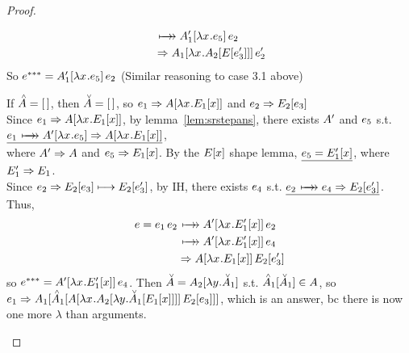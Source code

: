 \documentclass{article}
\begin{document}
\begin{proof}
\begin{byCases}
\begin{byCases}
\begin{align*}
                        &\srsteps \ap{\inA[_1']{\lx\e_5}}{\e_2} \\
                        &\pstep \ap{\inA[_1]{\lx\inA[_2]{\inE{\e_3'}}}}{\e_2'}
    \end{align*}
    So $\ethree = \ap{\inA[_1']{\lx\e_5}}{\e_2}$
    (Similar reasoning to case 3.1 above)
    \begin{byCases}
      \renewcommand{\byCasesCaseTemplate}[1]{\textbf{Subsubcase {#1}.}}
      \case{\Ap = \hole}
    If $\Ap = \hole$, then $\Am = \hole$, so
    $\e_1 \pstep \inA{\lx\inE[_1]{x}}$ and $\e_2 \pstep \inE[_2]{\e_3}$\\
    Since $\e_1 \pstep \inA{\lx\inE[_1]{x}}$, by lemma~\ref{lem:srstepans}, 
    there exists $\A'$ and $\e_5$ s.t. 
    $\underline{\e_1 \srsteps \inA[']{\lx\e_5} \pstep \inA{\lx\inE[_1]{x}}}$,\\
    where $\A' \pstep \A$ and $\e_5 \pstep \Ex[_1]$. By the $\Ex$ shape lemma, 
    $\underline{\e_5 = \Ex[_1']}$, where $\E_1' \pstep \E_1$.\\
    Since $\e_2 \pstep \inE[_2]{\e_3} \srstep \inE[_2]{\e_3'}$, by IH,
    there exists $\e_4$ s.t. $\underline{\e_2 \srsteps \e_4
                                             \pstep \inE[_2]{\e_3'}}$. Thus,
    \begin{align*}
      \e = \ap{\e_1}{\e_2} &\srsteps \ap{\inA[']{\lx\Ex[_1']}}{\e_2} \\
                           &\srsteps \ap{\inA[']{\lx\Ex[_1']}}{\e_4} \\
                           &\pstep \ap{\inA{\lx\Ex[_1]}}{\inE[_2]{\e_3'}}
    \end{align*}
    so $\ethree = \ap{\inA[']{\lx\Ex[_1']}}{\e_4}$.
    Then $\Am = \inA[_2]{\ly\Am_1}$ s.t. $\inAp[_1]{\Am_1} \in \A$,
    so $\e_1 \pstep 
    \inA[_1]{\inAp[_1]{{\ap{\inA{\lx\inA[_2]{\ly\inAm[_1]{\inE[_1]{x}}}}}
                          {\inE[_2]{\e_3}}}}}$, 
    which is an answer, bc there is now one more $\lambda$ than arguments.
    \begin{byCases}
      \renewcommand{\byCasesCaseTemplate}[1]{\textbf{Subsubsubcase {#1}.}}

\end{byCases}
\end{byCases}
\end{byCases}
\end{byCases}
\end{proof}
\end{document}
